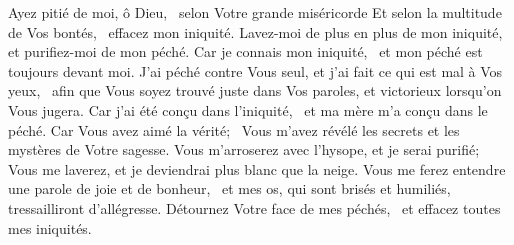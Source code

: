 {Ayez pitié de moi, ô Dieu,~\* selon Votre grande miséricorde}
{Et selon la multitude de Vos bontés,~\* effacez mon iniquité.}
{Lavez-moi de plus en plus de mon iniquité,~\* et purifiez-moi de mon péché.}
{Car je connais mon iniquité,~\* et mon péché est toujours devant moi.}
{J'ai péché contre Vous seul, et j'ai fait ce qui est mal à Vos yeux,~\* afin que Vous soyez trouvé juste dans Vos paroles, et victorieux lorsqu'on Vous jugera.}
{Car j'ai été conçu dans l'iniquité,~\* et ma mère m'a conçu dans le péché.}
{Car Vous avez aimé la vérité;~\* Vous m'avez révélé les secrets et les mystères de Votre sagesse.}
{Vous m'arroserez avec l'hysope, et je serai purifié;~\* Vous me laverez, et je deviendrai plus blanc que la neige.}
{Vous me ferez entendre une parole de joie et de bonheur,~\* et mes os, qui sont brisés et humiliés, tressailliront d'allégresse.}
{Détournez Votre face de mes péchés,~\* et effacez toutes mes iniquités.}